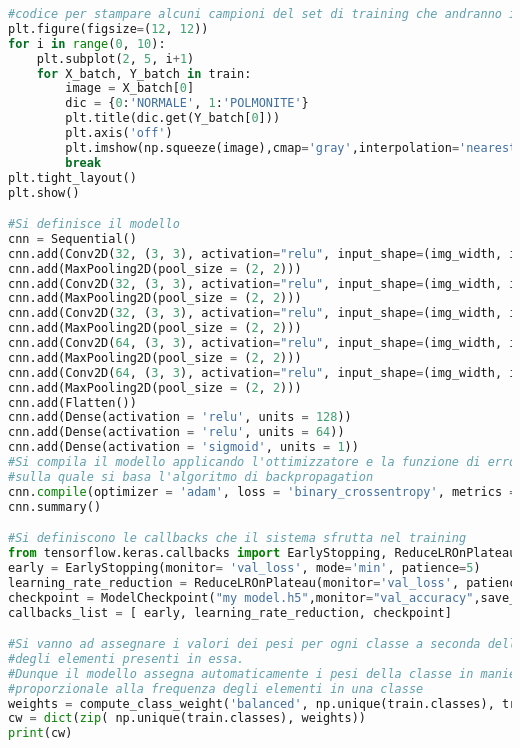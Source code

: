 \begin{lstlisting}[basicstyle=\tiny, language=Python, caption=Esempio di implementazione di una CNN per la classificazione di raggi-X.~\cite{dspneum} ]
#codice per stampare alcuni campioni del set di training che andranno in input alla rete
plt.figure(figsize=(12, 12))
for i in range(0, 10):
    plt.subplot(2, 5, i+1)
    for X_batch, Y_batch in train:
        image = X_batch[0]        
        dic = {0:'NORMALE', 1:'POLMONITE'}
        plt.title(dic.get(Y_batch[0]))
        plt.axis('off')
        plt.imshow(np.squeeze(image),cmap='gray',interpolation='nearest')
        break
plt.tight_layout()
plt.show()

#Si definisce il modello
cnn = Sequential()
cnn.add(Conv2D(32, (3, 3), activation="relu", input_shape=(img_width, img_height, channels)))
cnn.add(MaxPooling2D(pool_size = (2, 2)))
cnn.add(Conv2D(32, (3, 3), activation="relu", input_shape=(img_width, img_height, channels)))
cnn.add(MaxPooling2D(pool_size = (2, 2)))
cnn.add(Conv2D(32, (3, 3), activation="relu", input_shape=(img_width, img_height,  channels)))
cnn.add(MaxPooling2D(pool_size = (2, 2)))
cnn.add(Conv2D(64, (3, 3), activation="relu", input_shape=(img_width, img_height, channels)))
cnn.add(MaxPooling2D(pool_size = (2, 2)))
cnn.add(Conv2D(64, (3, 3), activation="relu", input_shape=(img_width, img_height, channels)))
cnn.add(MaxPooling2D(pool_size = (2, 2)))
cnn.add(Flatten())
cnn.add(Dense(activation = 'relu', units = 128))
cnn.add(Dense(activation = 'relu', units = 64))
cnn.add(Dense(activation = 'sigmoid', units = 1))
#Si compila il modello applicando l'ottimizzatore e la funzione di errore 
#sulla quale si basa l'algoritmo di backpropagation
cnn.compile(optimizer = 'adam', loss = 'binary_crossentropy', metrics = ['accuracy'])
cnn.summary()

#Si definiscono le callbacks che il sistema sfrutta nel training
from tensorflow.keras.callbacks import EarlyStopping, ReduceLROnPlateau, TensorBoard, ModelCheckpoint
early = EarlyStopping(monitor= 'val_loss', mode='min', patience=5)
learning_rate_reduction = ReduceLROnPlateau(monitor='val_loss', patience = 2, verbose=1,factor=0.3,min_delta = 0.001, min_lr=0.000001)
checkpoint = ModelCheckpoint("my model.h5",monitor="val_accuracy",save_best_only=True,mode="auto",verbose=1)
callbacks_list = [ early, learning_rate_reduction, checkpoint]

#Si vanno ad assegnare i valori dei pesi per ogni classe a seconda della cardinalita 
#degli elementi presenti in essa. 
#Dunque il modello assegna automaticamente i pesi della classe in maniera inversamente
#proporzionale alla frequenza degli elementi in una classe
weights = compute_class_weight('balanced', np.unique(train.classes), train.classes)
cw = dict(zip( np.unique(train.classes), weights))
print(cw)


\end{lstlisting}
